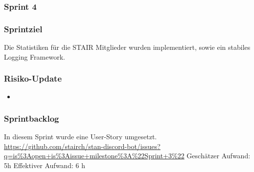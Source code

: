 \documentclass[a4paper, table]{article}
\begin{document}
\subsubsection{Sprint 4}
\subsubsection*{Sprintziel}
Die Statistiken für die STAIR Mitglieder wurden implementiert, sowie ein stabiles Logging Framework.

\subsubsection*{Risiko-Update}
\begin{itemize}
    \item 
\end{itemize}

\subsubsection*{Sprintbacklog}
In diesem Sprint wurde eine User-Story umgesetzt.\\
\url{https://github.com/stairch/stan-discord-bot/issues?q=is%3Aopen+is%3Aissue+milestone%3A%22Sprint+3%22}
\newline
Geschätzer Aufwand: 5h
\newline
Effektiver Aufwand: 6 h
\end{document}
